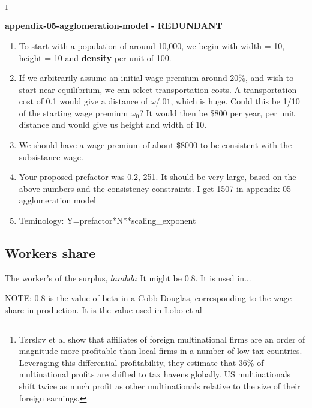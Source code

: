 \footnote{Tørsløv et al \cite{torslovMissingProfitsNations2023} show that affiliates of foreign multinational firms are an order of magnitude more profitable than local firms in a number of low-tax countries. Leveraging this differential profitability, they estimate that 36\% of multinational profits are shifted to tax havens globally. US multinationals shift twice as much profit as other multinationals relative to the size of their foreign earnings.}


\textbf{appendix-05-agglomeration-model - REDUNDANT} %



\begin{enumerate}
\item To start with a population of around 10,000, we begin with width = 10, height = 10 and \textbf{density} per unit of 100. 

\item If we arbitrarily assume an initial wage premium around 20\%, and wish to start near equilibrium, %
we can select transportation costs. A transportation cost of 0.1  would give a distance of $\omega/.01$, which is huge. Could this be 1/10 of the starting wage premium $\omega_0$? It would then be \$800 per year, per unit distance and would give us height and width of 10. 
\item We should have a wage premium of about \$8000 to be consistent with the subsistance wage. %

\item Your proposed prefactor was 0.2,  251. It should be very large, based on the above numbers and the consistency constraints. I get 1507 in appendix-05-agglomeration model

\item Teminology: Y=prefactor*N**scaling\_exponent

\end{enumerate}

\subsection{Workers share}
The worker's of the surplus, $lambda$ It might be 0.8. It is used in...

NOTE: 0.8 is the value of beta in a Cobb-Douglas, corresponding to the wage-share in production. It is the value used in Lobo et al


